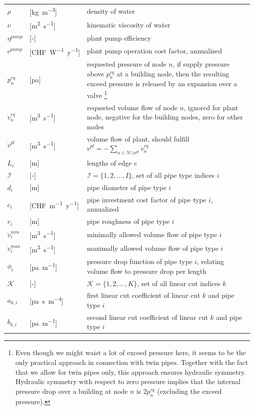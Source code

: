 \documentclass[a4paper,10pt]{article}
\begin{document}
\begin{tabularx}{\textwidth}{llX}
  $\rho$ &[\si{kg.m^{-3}}]& density of water\\
  $\nu$ &[\si{m^{2}.s^{-1}}]& kinematic viscosity of water\\
  $\eta^{pump}$ &[-]& plant pump efficiency\\
  $c^{pump}$ &[\si{CHF.W^{-1}.y^{-1}}]& plant pump operation cost factor, 
                                        annualized\\
  $p_n^{rq}$ &[\si{pa}]& requested pressure of node $n$,
                         if supply pressure above $p_n^{rq}$ at a building node, then the resulting exceed pressure is released by an expansion over a valve
                         \footnote{Even though we might waist a lot of exceed pressure here, it seems to be the only practical approach in connection with twin pipes.
                         Together with the fact that we allow for twin pipes only, this approach ensures hydraulic symmetry.
                         Hydraulic symmetry with respect to zero pressure implies that the internal pressure drop over a building at node $n$ is $2 p_n^{rq}$ (excluding the exceed pressure).}\\
  $\dot{v}_n^{rq}$ &[\si{m^{3}.s^{-1}}]& requested volume flow of node $n$,
                                         ignored for plant node,
                                         negative for the building nodes,
                                         zero for other nodes\\
  $\dot{v}^{pl}$ &[\si{m^{3}.s^{-1}}]& volume flow of plant,                                      
                                       should fulfill $\dot{v}^{pl}=-\sum_{n\in\mathcal{N}\setminus n^{pl}}\dot{v}_n^{rq}$\\
  $L_e$ &[\si{m}]& lengths of edge $e$\\
  $\mathcal{I}$&[-]& $\mathcal{I} = \{1,2,\dots,I\}$,
                   set of all pipe type indices $i$\\
  $d_i$ &[\si{m}]& pipe diameter of pipe type $i$\\
  $c_i$ &[\si{CHF.m^{-1}.y^{-1}}]& pipe investment cost factor of pipe type $i$,
				    annualized\\
  $r_i$ &[\si{m}]& pipe roughness of pipe type $i$\\
  $\dot{v}_i^{min}$ &[\si{m^{3}.s^{-1}}]& minimally allowed volume flow of pipe type $i$\\
  $\dot{v}_i^{max}$ &[\si{m^{3}.s^{-1}}]& maximally allowed volume flow of pipe type $i$\\
  $\phi_i$ &[\si{pa.m^{-1}}]& pressure drop function of pipe type $i$,
	                      relating volume flow to pressure drop per length\\
  $\mathcal{K}$&[-]& $\mathcal{K} = \{1,2,\dots,K\}$,
                     set of all linear cut indices $k$\\
  $a_{k,i}$ &[\si{pa.s.m^{-4}}]& first linear cut coefficient of linear cut $k$ and pipe type $i$\\
  $b_{k,i}$ &[\si{pa.m^{-1}}]& second linear cut coefficient of linear cut $k$ and pipe type $i$

\end{tabularx}
\end{document}
